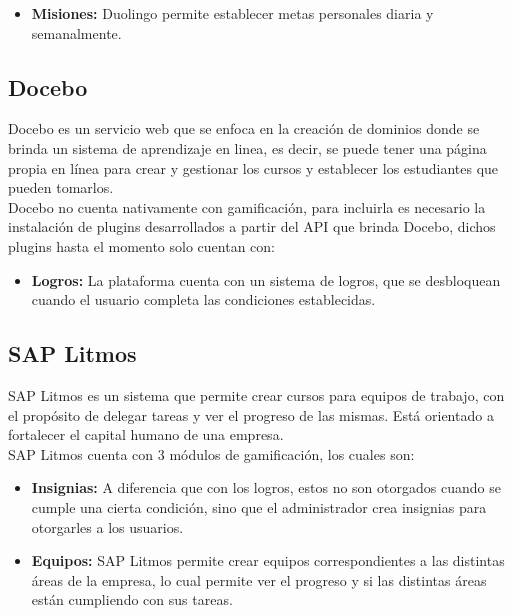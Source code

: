 \begin{multicols*}{2}
\begin{itemize}
    \item {\bf Misiones:} Duolingo permite establecer metas personales diaria y
        semanalmente.

    \end{itemize}


\subsection{Docebo}

 Docebo \cite{PagDocebo} es un servicio web que se enfoca en la creación de dominios donde se brinda
 un sistema de aprendizaje en linea, es decir, se puede tener una página propia en línea para crear y gestionar
 los cursos y establecer los estudiantes que pueden tomarlos.\\

 \noindent Docebo no cuenta nativamente con gamificación, para incluirla es necesario la instalación
 de plugins desarrollados a partir del API que brinda Docebo, dichos plugins hasta el momento solo
 cuentan con:

    \begin{itemize}
    \item {\bf Logros:} La plataforma cuenta con un sistema de logros, que se
                        desbloquean cuando el usuario completa las condiciones
                        establecidas.
    \end{itemize}

\subsection{SAP Litmos}

 SAP Litmos \cite{PagSAPLitmos} es un sistema que permite crear cursos para
 equipos de trabajo, con el propósito de delegar tareas y ver el progreso de
 las mismas. Está orientado a fortalecer el capital humano de una empresa.\\

    \noindent SAP Litmos cuenta con 3 módulos de gamificación, los cuales son:

    \begin{itemize}
        \item {\bf Insignias:} A diferencia que con los logros, estos
        no son otorgados cuando se cumple una cierta condición, sino
        que el administrador crea insignias para otorgarles a los usuarios.

        \item {\bf Equipos:} SAP Litmos permite crear equipos correspondientes
        a las distintas áreas de la empresa, lo cual permite ver el progreso
        y si las distintas áreas están cumpliendo con sus tareas.


\end{itemize}
\end{multicols*}
